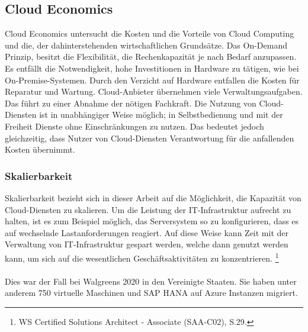 \subsection{Cloud Economics}\label{subsec_UabsGrund3}
\begin{flushleft}
Cloud Economics untersucht die Kosten und die Vorteile von Cloud Computing und die, der dahinterstehenden wirtschaftlichen Grundsätze. Das On-Demand Prinzip, besitzt die Flexibilität, die Rechenkapazität je nach Bedarf anzupassen. Es entfällt die Notwendigkeit, hohe Investitionen in Hardware zu tätigen, wie bei On-Premise-Systemen.
Durch den Verzicht auf Hardware entfallen die Kosten für Reparatur und Wartung. Cloud-Anbieter übernehmen viele Verwaltungsaufgaben. Das führt zu einer Abnahme der nötigen Fachkraft\cite{IDC01}. Die Nutzung von Cloud-Diensten ist in unabhängiger Weise möglich; in Selbstbedienung und mit der Freiheit Dienste ohne Einschränkungen zu nutzen. Das bedeutet jedoch gleichzeitig, dass Nutzer von Cloud-Diensten Verantwortung für die anfallenden Kosten übernimmt.
\end{flushleft}

\subsubsection{Skalierbarkeit}
Skalierbarkeit bezieht sich in dieser Arbeit auf die Möglichkeit, die Kapazität von Cloud-Diensten zu skalieren. Um die Leistung der IT-Infrastruktur aufrecht zu halten, ist es zum Beispiel möglich, das Serversystem so zu konfigurieren, dass es auf wechselnde Lastanforderungen reagiert.
%
Auf diese Weise kann Zeit mit der Verwaltung von IT-Infrastruktur gespart werden, welche dann genutzt werden kann, um sich auf die wesentlichen Geschäftsaktivitäten zu konzentrieren.
\footnote{WS Certified Solutions Architect - Associate (SAA-C02), S.29.\cite{AWS1}}
\\\\
Dies war der Fall bei Walgreens 2020 in den Vereinigte Staaten.
Sie haben unter anderem 750 virtuelle Maschinen und SAP HANA auf Azure Instanzen migriert.

